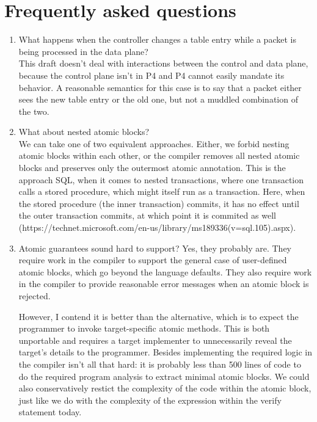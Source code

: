 \section{Frequently asked questions}
\begin{enumerate}
\item What happens when the controller changes a table entry while a packet is
being processed in the data plane? \\
This draft doesn't deal with interactions between the control and data plane,
because the control plane isn't in P4 and P4 cannot easily mandate its
behavior. A reasonable semantics for this case is to say that a packet either
sees the new table entry or the old one, but not a muddled combination of the
two.

\item What about nested atomic blocks?\\
We can take one of two equivalent approaches. Either, we forbid nesting
atomic blocks within each other, or the compiler removes all nested atomic
blocks and preserves only the outermost atomic annotation. This is the approach
SQL, when it comes to nested transactions, where one transaction calls a stored
procedure, which might itself run as a transaction. Here, when the stored
procedure (the inner transaction) commits, it has no effect until the outer
transaction commits, at which point it is commited as well
(https://technet.microsoft.com/en-us/library/ms189336(v=sql.105).aspx).

\item Atomic guarantees sound hard to support?
Yes, they probably are. They require work in the compiler to support the
general case of user-defined atomic blocks, which go beyond the language
defaults. They also require work in the compiler to provide reasonable error
messages when an atomic block is rejected.

However, I contend it is better than the alternative, which is to expect the
programmer to invoke target-specific atomic methods. This is both unportable
and requires a target implementer to unnecessarily reveal the target's details
to the programmer. Besides implementing the required logic in the compiler
isn't all that hard: it is probably less than 500 lines of code to do the
required program analysis to extract minimal atomic blocks. We could also
conservatively restict the complexity of the code within the atomic block, just
like we do with the complexity of the expression within the verify statement
today.


\end{enumerate}
